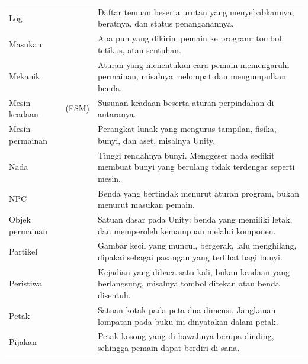 \begin{longtable}{@{}L{3.9cm} L{3.6cm} L{7.2cm}@{}}
Log  &  &
Daftar temuan beserta urutan yang menyebabkannya, beratnya, dan status
penanganannya. \\ \addlinespace

Masukan &  &
Apa pun yang dikirim pemain ke program: tombol, tetikus, atau sentuhan. \\
\addlinespace

Mekanik &  &
Aturan yang menentukan cara pemain memengaruhi permainan, misalnya melompat
dan mengumpulkan benda. \\ \addlinespace

Mesin keadaan &  (FSM) &
Susunan keadaan beserta aturan perpindahan di antaranya. \\
\addlinespace

Mesin permainan &  &
Perangkat lunak yang mengurus tampilan, fisika, bunyi, dan aset, misalnya
Unity. \\ \addlinespace

Nada &  &
Tinggi rendahnya bunyi. Menggeser nada sedikit membuat bunyi yang berulang
tidak terdengar seperti mesin. \\ \addlinespace

NPC &  &
Benda yang bertindak menurut aturan program, bukan menurut masukan pemain. \\
\addlinespace

Objek permainan &  &
Satuan dasar pada Unity: benda yang memiliki letak, dan memperoleh kemampuan
melalui komponen. \\ \addlinespace

Partikel &  &
Gambar kecil yang muncul, bergerak, lalu menghilang, dipakai sebagai pasangan
yang terlihat bagi bunyi. \\ \addlinespace

Peristiwa &  &
Kejadian yang dibaca satu kali, bukan keadaan yang berlangsung, misalnya
tombol ditekan atau benda disentuh. \\ \addlinespace

Petak &  &
Satuan kotak pada peta dua dimensi. Jangkauan lompatan pada buku ini dinyatakan
dalam petak. \\ \addlinespace

Pijakan &  &
Petak kosong yang di bawahnya berupa dinding, sehingga pemain dapat berdiri di
sana. \\ \addlinespace


\end{longtable}
